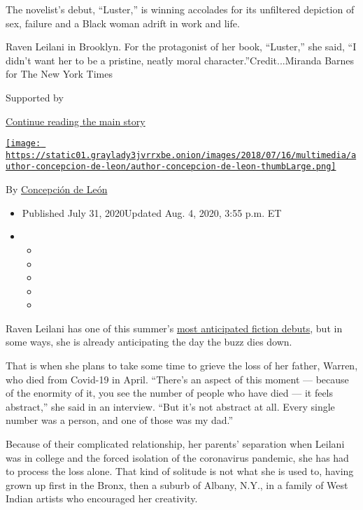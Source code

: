 The novelist's debut, ``Luster,'' is winning accolades for its
unfiltered depiction of sex, failure and a Black woman adrift in work
and life.

Raven Leilani in Brooklyn. For the protagonist of her book, ``Luster,''
she said, ``I didn't want her to be a pristine, neatly moral
character.''Credit...Miranda Barnes for The New York Times

Supported by

\protect\hyperlink{after-sponsor}{Continue reading the main story}

\href{https://www.nytimes3xbfgragh.onion/by/concepcion-de-leon}{\texttt{[image: https://static01.graylady3jvrrxbe.onion/images/2018/07/16/multimedia/author-concepcion-de-leon/author-concepcion-de-leon-thumbLarge.png]}}

By
\href{https://www.nytimes3xbfgragh.onion/by/concepcion-de-leon}{Concepción
de León}

\begin{itemize}
\item
  Published July 31, 2020Updated Aug. 4, 2020, 3:55 p.m. ET
\item
  \begin{itemize}
  \item
  \item
  \item
  \item
  \item
  \end{itemize}
\end{itemize}

Raven Leilani has one of this summer's
\href{https://www.nytimes3xbfgragh.onion/2020/07/30/books/new-august-books.html}{most
anticipated fiction debuts}, but in some ways, she is already
anticipating the day the buzz dies down.

That is when she plans to take some time to grieve the loss of her
father, Warren, who died from Covid-19 in April. ``There's an aspect of
this moment --- because of the enormity of it, you see the number of
people who have died --- it feels abstract,'' she said in an interview.
``But it's not abstract at all. Every single number was a person, and
one of those was my dad.''

Because of their complicated relationship, her parents' separation when
Leilani was in college and the forced isolation of the coronavirus
pandemic, she has had to process the loss alone. That kind of solitude
is not what she is used to, having grown up first in the Bronx, then a
suburb of Albany, N.Y., in a family of West Indian artists who
encouraged her creativity.

